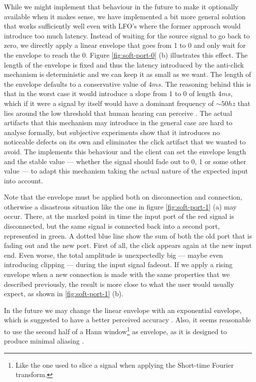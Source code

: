 While we might implement that behaviour in the future to make it
optionally available when it makes sense, we have implemented a bit
more general solution that works sufficiently well even with LFO's
where the former approach would introduce too much latency. Instead of
waiting for the source signal to go back to zero, we directly apply a
linear envelope that goes from 1 to 0 and only wait for the envelope
to reach the 0. Figure \ref{fig:soft-port-0} (b) illustrates this
effect. The length of the envelope is fixed and thus the latency
introduced by the anti-click mechanism is deterministic and we can
keep it as small as we want. The length of the envelope defaults to a
conservative value of $4 ms$. The reasoning behind this is that in the
worst case it would introduce a slope from 1 to 0 of length $4ms$,
which if it were a signal by itself would have a dominant frequency of
$\sim 50 hz$ that lies around the low threshold that human hearing can
perceive \cite{goldstein01sensation}. The actual artifacts that this
mechanism may introduce in the general case are hard to analyse
formally, but subjective experiments show that it introduces no
noticeable defects on its own and eliminates the click artifact that
we wanted to avoid. The  implements this
behaviour and the client can set the envelope length and the stable
value --- whether the signal should fade out to 0, 1 or some other
value --- to adapt this mechanism taking the actual nature of the
expected input into account.

Note that the envelope must be applied both on disconnection and
connection, otherwise a disastrous situation like the one in figure
\ref{fig:soft-port-1} (a) may occur. There, at the marked point in
time the input port of the red signal is disconnected, but the same
signal is connected back into a second port, represented in green. A
dotted blue line show the sum of both the old port that is fading out
and the new port. First of all, the click appears again at the new
input end. Even worse, the total amplitude is unexpectedly big ---
maybe even introducing clipping --- during the input
signal fadeout. If we apply a rising envelope when a new connection is
made with the same properties that we described previously, the result
is more close to what the user would usually expect, as shown in
\ref{fig:soft-port-1} (b).

In the future we may change the linear envelope with an exponential
envelope, which is suggested to have a better perceived accuracy
\cite{boulanger10audio}. Also, it seems reasonable to use the second
half of a Hann window\footnote{Like the one used to slice a signal
  when applying the Short-time Fourier transform.} as envelope, as it
is designed to produce minimal aliasing \cite{blackman59measurement}.

